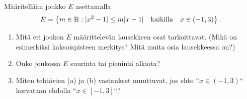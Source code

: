 \documentclass[11pt,a4paper]{amsart}
\begin{document}
\begin{exercise}
Määritellään joukko \(E\) asettamalla
\[E = \left\{m \in \mathbb{R} : \lvert x^2 - 1\rvert \leq m\lvert x - 1\rvert \quad
\text{kaikilla} \quad x \in (-1, 3) \right\}.\]
\begin{enumerate}[label=\alph*), nosep]
\item Mitä eri joukon \(E\) määrittelevän lausekkeen osat tarkoittavat.
(Mikä on esimerkiksi kaksoispisteen merkitys? Mitä muita osia lausekkeessa on?)
\item Onko joukossa \(E\) suurinta tai pienintä alkiota?
\item Miten tehtävien (a) ja (b) vastaukset muuttuvat, jos ehto ``\(x
\in (-1, 3)\)`` korvataan ehdolla ``\(x \in [-1, 3]\)``?
\end{enumerate}
\end{exercise}
\end{document}
